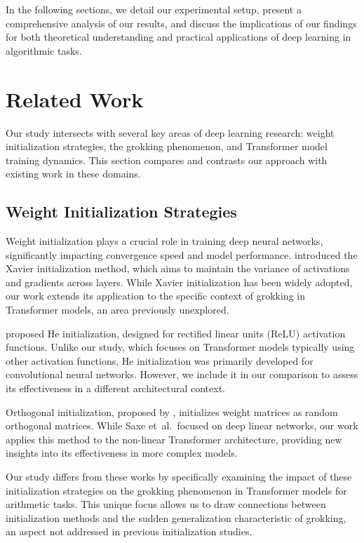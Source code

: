 \documentclass{article} %
\begin{document}
In the following sections, we detail our experimental setup, present a comprehensive analysis of our results, and discuss the implications of our findings for both theoretical understanding and practical applications of deep learning in algorithmic tasks.

\section{Related Work}
\label{sec:related}
Our study intersects with several key areas of deep learning research: weight initialization strategies, the grokking phenomenon, and Transformer model training dynamics. This section compares and contrasts our approach with existing work in these domains.

\subsection{Weight Initialization Strategies}
Weight initialization plays a crucial role in training deep neural networks, significantly impacting convergence speed and model performance. \citet{Glorot2010UnderstandingTD} introduced the Xavier initialization method, which aims to maintain the variance of activations and gradients across layers. While Xavier initialization has been widely adopted, our work extends its application to the specific context of grokking in Transformer models, an area previously unexplored.

\citet{He2015DelvingDI} proposed He initialization, designed for rectified linear units (ReLU) activation functions. Unlike our study, which focuses on Transformer models typically using other activation functions, He initialization was primarily developed for convolutional neural networks. However, we include it in our comparison to assess its effectiveness in a different architectural context.

Orthogonal initialization, proposed by \citet{Saxe2013ExactST}, initializes weight matrices as random orthogonal matrices. While Saxe et~al.\ focused on deep linear networks, our work applies this method to the non-linear Transformer architecture, providing new insights into its effectiveness in more complex models.

Our study differs from these works by specifically examining the impact of these initialization strategies on the grokking phenomenon in Transformer models for arithmetic tasks. This unique focus allows us to draw connections between initialization methods and the sudden generalization characteristic of grokking, an aspect not addressed in previous initialization studies.
\end{document}
